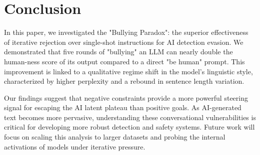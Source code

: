 \section{Conclusion}
\label{sec:conclusion}

In this paper, we investigated the "Bullying Paradox": the superior effectiveness of iterative rejection over single-shot instructions for AI detection evasion. We demonstrated that five rounds of "bullying" an LLM can nearly double the human-ness score of its output compared to a direct "be human" prompt. This improvement is linked to a qualitative regime shift in the model's linguistic style, characterized by higher perplexity and a rebound in sentence length variation.

Our findings suggest that negative constraints provide a more powerful steering signal for escaping the AI latent plateau than positive goals. As AI-generated text becomes more pervasive, understanding these conversational vulnerabilities is critical for developing more robust detection and safety systems. Future work will focus on scaling this analysis to larger datasets and probing the internal activations of models under iterative pressure.
